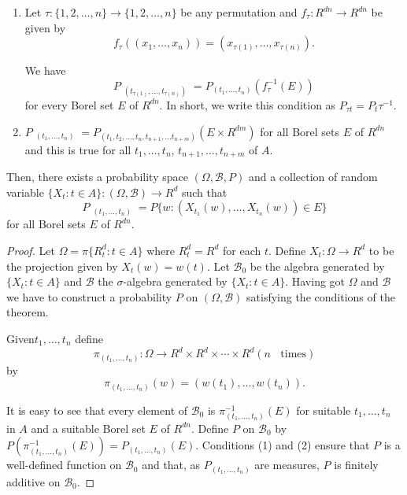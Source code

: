 \begin{enumerate}
\renewcommand{\theenumi}{\roman{enumi}}
\renewcommand{\labelenumi}{(\theenumi)}
\item Let $\tau:\{1,2,\ldots,n\}\to \{1,2,\ldots,n\}$ be any
  permutation and $f_{\tau}:R^{dn}\to R^{dn}$ be given by
$$
f_{\tau}((x_{1},\ldots,x_{n}))=(x_{\tau(1)},\ldots,x_{\tau(n)}).
$$

We have
$$
P{\displaystyle{\mathop{(E)}_{(t_{\tau(1)},\ldots,t_{\tau(n)})}}}=P_{(t_{1},\ldots,t_{n})}(f^{-1}_{\tau}(E)) 
$$
for every Borel set $E$ of $R^{dn}$. In short, we write this condition
as $P_{\tau t}=P_{t}\tau^{-1}$.

\item
  $P{\displaystyle{\mathop{(E)}_{(t_{1},\ldots,t_{n})}}}=P_{(t_{1},t_{2},\ldots,t_{n},t_{n+1},\ldots
  t_{n+m})}(E\times R^{dm})$ for all Borel sets $E$ of $R^{dn}$ and
  this is true for all $t_{1},\ldots,t_{n}$, $t_{n+1},\ldots,t_{n+m}$
  of $A$.
\end{enumerate}

Then, there exists a probability space $(\Omega,\mathscr{B},P)$ and a
collection of random variable $\{X_{t}:t\in
A\}:(\Omega,\mathscr{B})\to R^{d}$ such that
$$
P{\displaystyle{\mathop{(E)}_{(t_{1},\ldots,t_{n})}}}=P\{w:(X_{t_{1}}(w),\ldots,X_{t_{n}}(w))\in E\}
$$
for all Borel sets $E$ of $R^{dn}$.

\begin{proof}
Let $\Omega=\pi\{R^{d}_{t}:t\in A\}$ where $R^{d}_{t}=R^{d}$ for each
$t$. Define $X_{t}:\Omega\to R^{d}$ to be the projection given by
$X_{t}(w)=w(t)$. Let $\mathscr{B}_{0}$ be the algebra generated by
$\{X_{t}:t\in A\}$ and $\mathscr{B}$ the $\sigma$-algebra generated by
$\{X_{t}:t\in A\}$. Having got $\Omega$ and $\mathscr{B}$ we have to
construct a probability $P$ on $(\Omega,\mathscr{B})$ satisfying the
conditions of the theorem.

Given\pageoriginale $t_{1},\ldots,t_{n}$ define
$$
\pi_{(t_{1},\ldots,t_{n})}:\Omega\to R^{d}\times
R^{d}\times\cdots\times R^{d}(n~\text{~ times})
$$
by
$$
\pi_{(t_{1},\ldots,t_{n})}(w)=(w(t_{1}),\ldots,w(t_{n})).
$$

It is easy to see that every element of $\mathscr{B}_{0}$ is
$\pi^{-1}_{(t_{1},\ldots,t_{n})}(E)$ for suitable $t_{1},\ldots,t_{n}$
  in $A$ and a suitable Borel set $E$ of $R^{dn}$. Define $P$ on
  $\mathscr{B}_{0}$ by
  $P(\pi^{-1}_{(t_{1},\ldots,t_{n})}(E))=P_{(t_{1},\ldots,t_{n})}(E)$. Conditions
  (1) and (2) ensure that $P$ is a well-defined function on
  $\mathscr{B}_{0}$ and that, as $P_{(t_{1},\ldots,t_{n})}$ are
  measures, $P$ is finitely additive on $\mathscr{B}_{0}$.
\end{proof}

